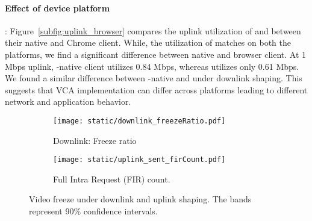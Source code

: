 \paragraph{Effect of device platform}: Figure~\ref{subfig:uplink_browser} compares the uplink utilization of \zoom and \teams between their native and Chrome client. While, the utilization of \zoom matches on both the platforms, we find a significant difference between \teams native and browser client. At 1 Mbps uplink, \teams-native client utilizes 0.84 Mbps, whereas \teamsbrowser utilizes only 0.61 Mbps. We found a similar difference between \teams-native and \teamsbrowser under downlink shaping. This suggests that VCA implementation can differ across platforms leading to different network and application behavior. 


\begin{figure}[t]
    \centering
    \begin{subfigure}[t]{0.4\textwidth}      
        \texttt{[image: static/downlink\_freezeRatio.pdf]}
        \caption{Downlink: Freeze ratio}
 		\label{subfig:downlink_freeze_ratio}
    \end{subfigure}
	\begin{subfigure}[t]{0.4\textwidth}   
        \centering
        \texttt{[image: static/uplink\_sent\_firCount.pdf]}
    \caption{Full Intra Request (FIR) count.}
    \label{subfig:uplink_fir}
    \end{subfigure}%
	\caption{Video freeze under downlink and uplink shaping. The bands represent 90\% confidence intervals.%
	}
	\label{fig:video_freeze}
\end{figure}







